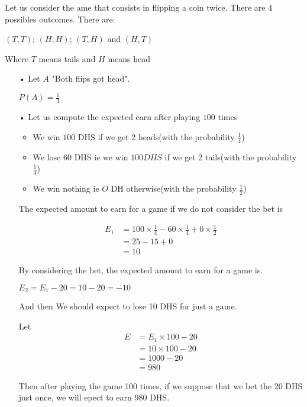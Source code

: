 \documentclass[11pt]{article}
\begin{document}
   Let us consider the ame that consists in flipping a coin twice.
   There are 4 possibles outcomes. There are:
   
   $(T,T)$; $(H,H)$; $(T,H)$ and $(H,T)$
   
   Where $T$ means tails and $H$ means head
   
   \begin{itemize}
   \item[•]Let  $A$ "Both flips got head".
   
   $P(A)=\frac{1}{4}$
   
   \item[•] Let us compute the expected earn after playing $100$ times
   \begin{itemize}
   \item We win $100$ DHS if we get 2 heads(with the probability $\frac{1}{4}$)
   
  \item We lose $60$ DHS ie we win $100 DHS$ if we get 2 tails(with the probability $\frac{1}{4}$)
  \item We win nothing ie $O$ DH otherwise(with the probability $\frac{1}{2}$)
  
  
   
   \end{itemize}
   
   The expected amount to earn for a game if we do not consider the bet is 
  
\begin{align*}
E_1 &=100\times \frac{1}{4}-60\times \frac{1}{4}+0 \times \frac{1}{2}\\
       &=25-15+0\\
       &=10
\end{align*}

By considering the bet, the expected amount to earn for a game is. 

$E_2=E_1-20=10-20=-10$

And then We should expect to lose 10 DHS for just a game.

Let
\begin{align*}
E &=E_1\times 100-20\\
       &=10\times 100-20\\
       &=1000-20\\
       &=980
\end{align*} 

Then after playing the game 100 times, if we suppose that we bet the 20 DHS just once, we will epect to earn 980 DHS.
   
   \end{itemize}
   
\end{document}
